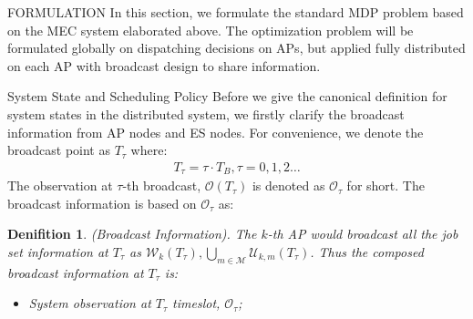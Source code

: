 \documentclass[10pt, conference, letterpaper]{IEEEtran}
\newtheorem{definition}{Denifition}
\newcommand{\esSet}{\mathcal{M}}
\newcommand{\wSet}{\mathcal{W}}
\newcommand{\uSet}{\mathcal{U}}
\newcommand{\Obsv}{\mathcal{O}}
\begin{document}
    \begin{section}{FORMULATION}
        \label{sec:formulation}
        In this section, we formulate the standard MDP problem based on the MEC system elaborated above. The optimization problem will be formulated globally on dispatching decisions on APs, but applied fully distributed on each AP with broadcast design to share information.

        \begin{subsection}{System State and Scheduling Policy}
            Before we give the canonical definition for system states in the distributed system, we firstly clarify the broadcast information from AP nodes and ES nodes. For convenience, we denote the broadcast point as $T_\tau$ where:
            \begin{align}
                T_\tau = \tau \cdot T_B, \tau=0,1,2\dots
            \end{align}
            The observation at $\tau$-th broadcast, $\Obsv(T_\tau)$ is denoted as $\Obsv_\tau$ for short. The broadcast information is based on $\Obsv_\tau$ as:
            \begin{definition}(Broadcast Information).
                The $k$-th AP would broadcast all the job set information at $T_\tau$ as $\wSet_{k}(T_\tau), \bigcup\limits_{m\in\esSet}\uSet_{k,m}(T_\tau)$.
                Thus the composed broadcast information at $T_\tau$ is:
                \begin{itemize}
                    \item System observation at $T_\tau$ timeslot, $\Obsv_\tau$;
                \end{itemize}
            \end{definition}


\end{subsection}
\end{section}
\end{document}
